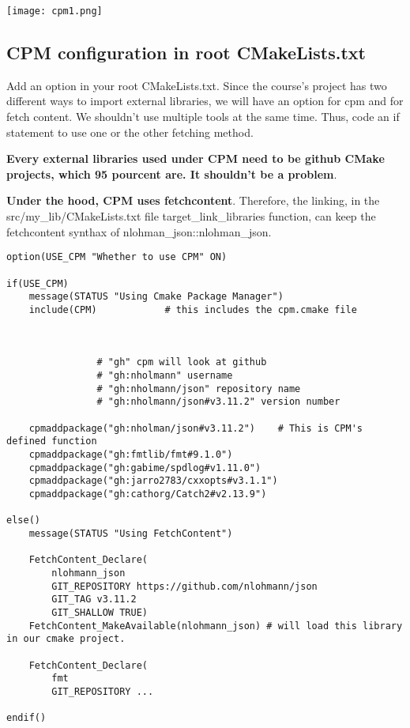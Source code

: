 \documentclass[openany]{report}
\begin{document}
\begin{center}
    \texttt{[image: cpm1.png]}
\end{center}


\subsection{CPM configuration in root CMakeLists.txt}

Add an option in your root CMakeLists.txt.
Since the course's project has two different ways to import external libraries,
we will have an option for cpm and for fetch content.
We shouldn't use multiple tools at the same time. Thus, code
an if statement to use one or the other fetching method.

\textbf{Every external libraries used under CPM need to be github CMake projects, which 95 pourcent are.
It shouldn't be a problem}.


\textbf{Under the hood, CPM uses fetchcontent}. Therefore, the linking,
in the src/my\_lib/CMakeLists.txt file target\_link\_libraries function, 
can keep the fetchcontent synthax of nlohman\_json::nlohman\_json.


\begin{verbatim}
option(USE_CPM "Whether to use CPM" ON)

if(USE_CPM)
    message(STATUS "Using Cmake Package Manager")
    include(CPM)            # this includes the cpm.cmake file
    


                # "gh" cpm will look at github
                # "gh:nholmann" username
                # "gh:nholmann/json" repository name
                # "gh:nholmann/json#v3.11.2" version number 

    cpmaddpackage("gh:nholman/json#v3.11.2")    # This is CPM's defined function
    cpmaddpackage("gh:fmtlib/fmt#9.1.0")
    cpmaddpackage("gh:gabime/spdlog#v1.11.0")
    cpmaddpackage("gh:jarro2783/cxxopts#v3.1.1")
    cpmaddpackage("gh:cathorg/Catch2#v2.13.9")

else()
    message(STATUS "Using FetchContent")

    FetchContent_Declare(
        nlohmann_json      
        GIT_REPOSITORY https://github.com/nlohmann/json
        GIT_TAG v3.11.2    
        GIT_SHALLOW TRUE)  
    FetchContent_MakeAvailable(nlohmann_json) # will load this library in our cmake project.

    FetchContent_Declare(
        fmt
        GIT_REPOSITORY ...

endif()
\end{verbatim}
\end{document}
